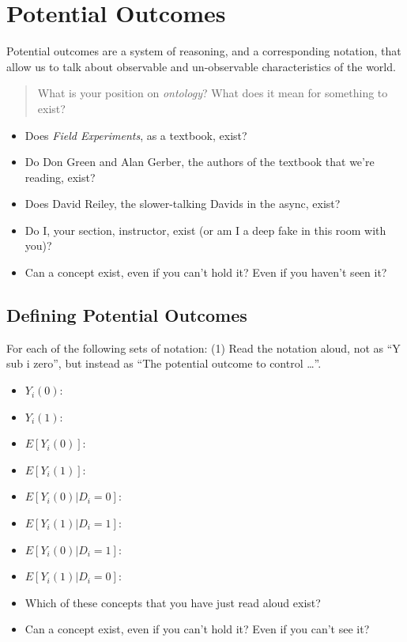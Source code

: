\documentclass[
]{book}
\providecommand{\tightlist}{%
  \setlength{\itemsep}{0pt}\setlength{\parskip}{0pt}}
\begin{document}
\hypertarget{potential-outcomes}{%
\section{Potential Outcomes}\label{potential-outcomes}}

Potential outcomes are a system of reasoning, and a corresponding
notation, that allow us to talk about observable and un-observable
characteristics of the world.

\begin{quote}
What is your position on \emph{ontology}? What does it mean for
something to exist?
\end{quote}

\begin{itemize}
\tightlist
\item
  Does \emph{Field Experiments}, as a textbook, exist?
\item
  Do Don Green and Alan Gerber, the authors of the textbook that we're
  reading, exist?
\item
  Does David Reiley, the slower-talking Davids in the async, exist?
\item
  Do I, your section, instructor, exist (or am I a deep fake in this
  room with you)?
\item
  Can a concept exist, even if you can't hold it? Even if you haven't
  seen it?
\end{itemize}

\hypertarget{defining-potential-outcomes}{%
\subsection{Defining Potential
Outcomes}\label{defining-potential-outcomes}}

For each of the following sets of notation: (1) Read the notation aloud,
not as ``Y sub i zero'', but instead as ``The potential outcome to
control \ldots{}''.

\begin{itemize}
\item
  \(Y_{i}(0)\):
\item
  \(Y_{i}(1)\):\\
\item
  \(E[Y_{i}(0)]\):
\item
  \(E[Y_{i}(1)]\):
\item
  \(E[Y_{i}(0)|D_{i}=0]\):
\item
  \(E[Y_{i}(1)|D_{i}=1]\):
\item
  \(E[Y_{i}(0)|D_{i}=1]\):
\item
  \(E[Y_{i}(1)|D_{i}=0]\):
\item
  Which of these concepts that you have just read aloud exist?
\item
  Can a concept exist, even if you can't hold it? Even if you can't see
  it?
\end{itemize}
\end{document}
